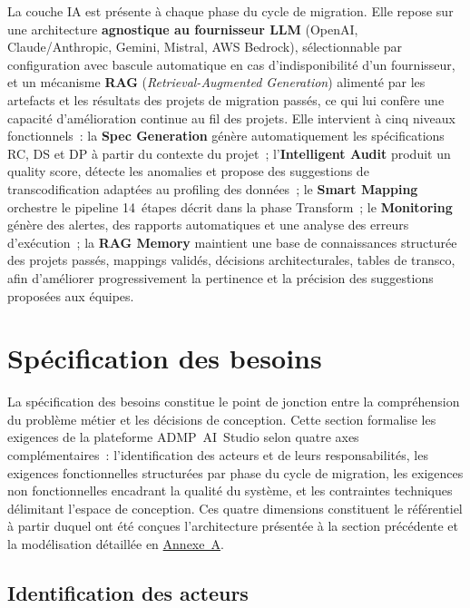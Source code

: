 La couche IA est présente à chaque phase du cycle de migration. Elle repose sur une architecture \textbf{agnostique au fournisseur LLM} (OpenAI, Claude/Anthropic, Gemini, Mistral, AWS Bedrock), sélectionnable par configuration avec bascule automatique en cas d'indisponibilité d'un fournisseur, et un mécanisme \textbf{RAG} (\textit{Retrieval-Augmented Generation}) alimenté par les artefacts et les résultats des projets de migration passés, ce qui lui confère une capacité d'amélioration continue au fil des projets. Elle intervient à cinq niveaux fonctionnels~: la \textbf{Spec Generation} génère automatiquement les spécifications RC, DS et DP à partir du contexte du projet~; l'\textbf{Intelligent Audit} produit un quality score, détecte les anomalies et propose des suggestions de transcodification adaptées au profiling des données~; le \textbf{Smart Mapping} orchestre le pipeline 14~étapes décrit dans la phase Transform~; le \textbf{Monitoring} génère des alertes, des rapports automatiques et une analyse des erreurs d'exécution~; la \textbf{RAG Memory} maintient une base de connaissances structurée des projets passés, mappings validés, décisions architecturales, tables de transco, afin d'améliorer progressivement la pertinence et la précision des suggestions proposées aux équipes.

\section{Spécification des besoins}
\label{sec:exigences}

La spécification des besoins constitue le point de jonction entre la compréhension du problème métier et les décisions de conception. Cette section formalise les exigences de la plateforme ADMP~AI~Studio selon quatre axes complémentaires~: l'identification des acteurs et de leurs responsabilités, les exigences fonctionnelles structurées par phase du cycle de migration, les exigences non fonctionnelles encadrant la qualité du système, et les contraintes techniques délimitant l'espace de conception. Ces quatre dimensions constituent le référentiel à partir duquel ont été conçues l'architecture présentée à la section précédente et la modélisation détaillée en \hyperref[annexe:uml]{Annexe~A}.

\subsection{Identification des acteurs}
\label{subsec:acteurs}


